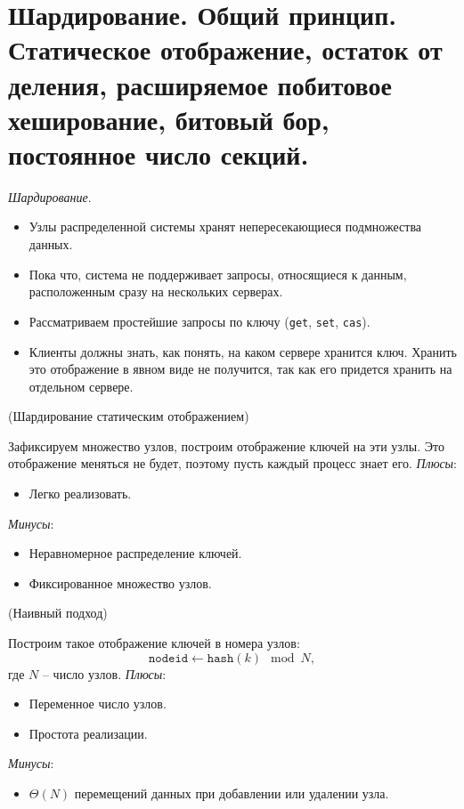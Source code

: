 \section{Шардирование. Общий принцип. Статическое отображение,
остаток от деления, расширяемое побитовое хеширование, битовый бор,
постоянное число секций.}

\begin{definition}
    \textit{Шардирование}.
    \begin{itemize}
        \item Узлы распределенной системы хранят непересекающиеся
            подмножества данных.
        \item Пока что, система не поддерживает запросы, относящиеся к данным,
            расположенным сразу на нескольких серверах.
        \item Рассматриваем простейшие запросы по ключу (\texttt{get}, \texttt{set},
            \texttt{cas}).
        \item Клиенты должны знать, как понять, на каком сервере хранится ключ.
            Хранить это отображение в явном виде не получится, так как его придется
            хранить на отдельном сервере.
    \end{itemize}
\end{definition}

\begin{algorithm}(Шардирование статическим отображением)

    Зафиксируем множество узлов, построим отображение ключей на эти узлы.
    Это отображение меняться не будет, поэтому пусть каждый процесс знает его.
    \textit{Плюсы}:
    \begin{itemize}
        \item Легко реализовать.
    \end{itemize}
    \textit{Минусы}:
    \begin{itemize}
        \item Неравномерное распределение ключей.
        \item Фиксированное множество узлов.
    \end{itemize}
\end{algorithm}

\begin{algorithm}(Наивный подход)

    Построим такое отображение ключей в номера узлов:
    \[
        \texttt{nodeid} \leftarrow \texttt{hash}(k) \mod N
    ,\]
    где $N$ -- число узлов.
    \textit{Плюсы}:
    \begin{itemize}
        \item Переменное число узлов.
        \item Простота реализации.
    \end{itemize}
    \textit{Минусы}:
    \begin{itemize}
        \item $\Theta(N)$ перемещений данных при добавлении или удалении узла.
    \end{itemize}
\end{algorithm}

